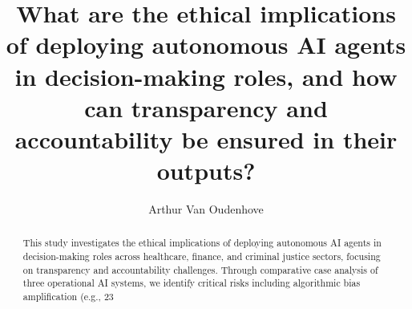 \documentclass[english]{hogent-article}
\title{What are the ethical implications of deploying autonomous AI agents in decision-making roles, and how can transparency and accountability be ensured in their outputs?}
\author{Arthur Van Oudenhove}
\begin{document}
\begin{abstract}
  This study investigates the ethical implications of deploying autonomous AI agents in decision-making roles across healthcare, finance, and criminal justice sectors, focusing on transparency and accountability challenges. Through comparative case analysis of three operational AI systems, we identify critical risks including algorithmic bias amplification (e.g., 23%
\end{abstract}

\tableofcontents

\bigskip

%
%

%
%
%
%
\end{document}
